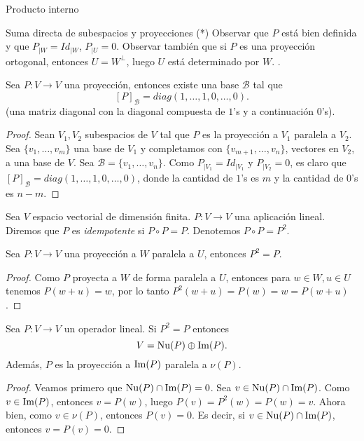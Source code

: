 \begin{chapter}{Producto interno}
\begin{section}{Suma directa de subespacios y proyecciones  (*)}
		Observar que $P$ está bien definida y que $P_{|W} = Id_{|W}$,  $P_{|U} = 0$. Observar también que si $P$  es una proyección ortogonal,  entonces $U = W^\perp$, luego $U$  está determinado por $W$. . 
		
		\medskip 
		
		\begin{proposicion}\label{matriz-proy}
			Sea $P: V \to V$ una proyección, entonces existe una base $\mathcal{B}$ tal que 
			$$
			[P]_{\mathcal{B}} = diag(1,\ldots,1,0,\ldots,0).
			$$
			(una  matriz diagonal con la diagonal compuesta de  $1$'s  y a continuación $0$'s).
		\end{proposicion}
		\begin{proof}
			Sean $V_1,V_2$ subespacios de $V$ tal que   $P$ es la {proyección a $V_1$ paralela a $V_2$}. Sea $\{v_1,\ldots,v_m\}$ una base de $V_1$ y completamos con $\{v_{m+1},\ldots,v_n\}$, vectores en $V_2$, a una base de $V$. Sea $\mathcal{B}= \{v_1,\ldots,v_n\}$. Como  $P_{|V_1} = Id_{|V_1}$ y  $P_{|V_2} = 0$, es claro que $
			[P]_{\mathcal{B}} = diag(1,\ldots,1,0,\ldots,0)
			$, donde la cantidad de $1$'s es  $m$  y la cantidad de $0$'s es $n-m$.
		\end{proof}
		
		\medskip
		
		\begin{definicion} Sea $V$ espacio vectorial de dimensión finita. $P:V \to V$ una aplicación lineal. Diremos que $P$ es \textit{idempotente} si $P\circ P = P$. Denotemos $P \circ P = P^2$.
		\end{definicion}
		
		
		
		
		\begin{proposicion}\label{proy->idem}
			Sea $P: V \to V$ una proyección a  $W$ paralela a  $U$, entonces $P^2 = P$.
		\end{proposicion}
		\begin{proof}
			Como $P$ proyecta a  $W$ de forma paralela a  $U$, entonces para $w \in W, u \in U$ tenemos  $P(w+u) = w$, por lo tanto  $P^2(w+u) = P(w) = w= P(w+u)$.
		\end{proof}
		
		\begin{teorema}\label{idem->proy}
			Sea $P: V \to V$ un operador lineal. Si $P^2 = P$  entonces
			$$
			V = \operatorname{Nu}(P) \oplus \operatorname{Im}(P).
			$$
			Además, $P$ es la proyección  a $\operatorname{Im}(P)$ paralela a $\nu(P)$.
		\end{teorema}
		\begin{proof} Veamos primero que $\operatorname{Nu}(P) \cap \operatorname{Im}(P)= 0$. Sea $v \in \operatorname{Nu}(P) \cap \operatorname{Im}(P)$. Como $v \in \operatorname{Im}(P)$, entonces $v = P(w)$, luego   $P(v) = P^2(w) =P(w) = v$. Ahora bien, como $v\in  \nu(P)$, entonces $P(v)=0$. Es decir, si  $v \in\operatorname{Nu}(P) \cap \operatorname{Im}(P)$, entonces  $v= P(v)=0$. 
			

\end{proof}
\end{section}
\end{chapter}
